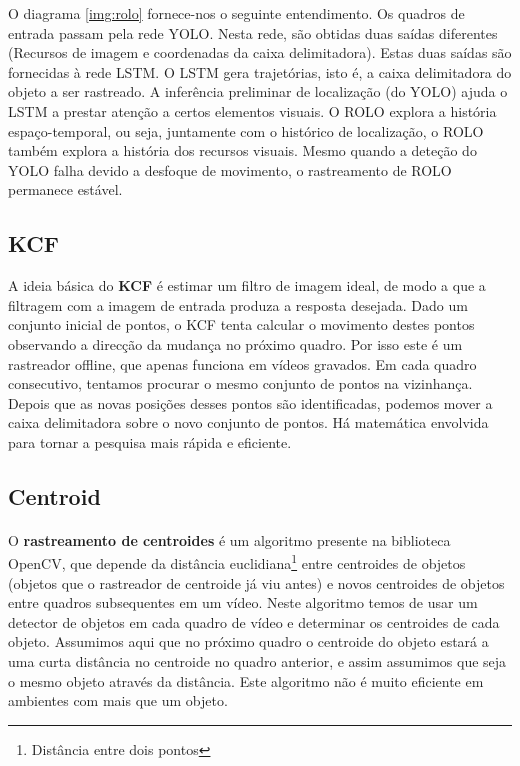 O diagrama \ref{img:rolo} fornece-nos o seguinte entendimento.
Os quadros de entrada passam pela rede \ac{YOLO}. Nesta rede, são obtidas duas saídas diferentes (Recursos de imagem e coordenadas da caixa delimitadora). Estas duas saídas são fornecidas à rede \ac{LSTM}. O \ac{LSTM} gera trajetórias, isto é, a caixa delimitadora do objeto a ser rastreado. A inferência preliminar de localização (do \ac{YOLO}) ajuda o \ac{LSTM} a prestar atenção a certos  elementos visuais. O \ac{ROLO} explora a história espaço-temporal, ou seja, juntamente com o histórico de localização, o \ac{ROLO} também explora a história dos recursos visuais. Mesmo quando a deteção do \ac{YOLO} falha devido a desfoque de movimento, o rastreamento de \ac{ROLO} permanece estável.


\subsection{KCF}
\label{chap2:subsec:rolo}

A ideia básica do \textbf{\ac{KCF}} é estimar um filtro de imagem ideal, de modo a que a filtragem com a imagem de entrada produza a resposta desejada.
Dado um conjunto inicial de pontos, o \ac{KCF} tenta calcular o movimento destes pontos observando a direcção da mudança no próximo quadro. Por isso este é um rastreador offline, que apenas funciona em vídeos gravados. Em cada quadro consecutivo, tentamos procurar o mesmo conjunto de pontos na vizinhança. Depois que as novas posições desses pontos são identificadas, podemos mover a caixa delimitadora sobre o novo conjunto de pontos. Há matemática envolvida para tornar a pesquisa mais rápida e eficiente.

\subsection{Centroid}
\label{chap2:subsec:centroid}

\paragraph{}
O \textbf{rastreamento de centroides} é um algoritmo presente na biblioteca \ac{OpenCV}, que depende da distância euclidiana\footnote{Distância entre dois pontos} entre centroides de objetos (objetos que o rastreador de centroide já viu antes) e novos centroides de objetos entre quadros subsequentes em um vídeo.
Neste algoritmo temos de usar um detector de objetos em cada quadro de vídeo e determinar os centroides de cada objeto. Assumimos aqui que no próximo quadro o centroide do objeto estará a uma curta distância no centroide no quadro anterior, e assim assumimos que seja o mesmo objeto através da distância. Este algoritmo não é muito eficiente em ambientes com mais que um objeto.

